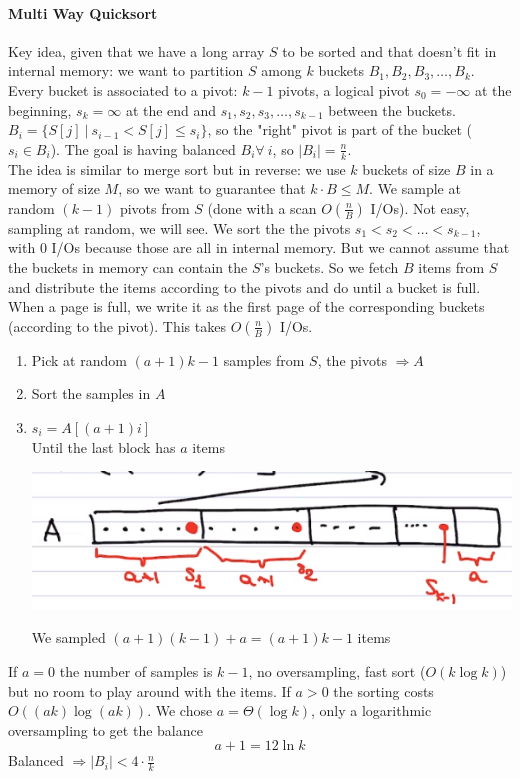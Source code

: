 \documentclass[10pt]{report}
\begin{document}
\paragraph{Multi Way Quicksort} Key idea, given that we have a long array $S$ to be sorted and that doesn't fit in internal memory: we want to partition $S$ among $k$ buckets $B_1,B_2,B_3,\ldots,B_k$. Every bucket is associated to a pivot: $k-1$ pivots, a logical pivot $s_0 = -\infty$ at the beginning, $s_k = \infty$ at the end and $s_1,s_2,s_3,\ldots,s_{k-1}$ between the buckets.\\
$B_i=\{S[j]\:|\: s_{i-1} < S[j] \leq s_i\}$, so the "right" pivot is part of the bucket ($s_i \in B_i$). The goal is having balanced $B_i \forall\:i$, so $|B_i| = \frac{n}{k}$.\\
The idea is similar to merge sort but in reverse: we use $k$ buckets of size $B$ in a memory of size $M$, so we want to guarantee that $k\cdot B \leq M$. We sample at random $(k-1)$ pivots from $S$ (done with a scan $O(\frac{n}{B})$ I/Os). Not easy, sampling at random, we will see. We sort the the pivots $s_1 < s_2 < \ldots < s_{k-1}$, with 0 I/Os because those are all in internal memory. But we cannot assume that the buckets in memory can contain the $S$'s buckets. So we fetch $B$ items from $S$ and distribute the items according to the pivots and do until a bucket is full. When a page is full, we write it as the first page of the corresponding buckets (according to the pivot). This takes $O(\frac{n}{B})$ I/Os.
\begin{enumerate}
	\item Pick at random $(a + 1)k - 1$ samples from $S$, the pivots $\Rightarrow A$
	\item Sort the samples in $A$
	\item $s_i = A[(a+1)i]$\\
	Until the last block has $a$ items
	\begin{center}
		\includegraphics[scale=0.5]{3.png}
	\end{center}
	We sampled $(a+1)(k-1) + a = (a+1)k -1$ items
\end{enumerate}
If $a = 0$ the number of samples is $k-1$, no oversampling, fast sort ($O(k\log k)$) but no room to play around with the items. If $a > 0$ the sorting costs $O((ak)\log (ak))$. We chose $a = \Theta(\log k)$, only a logarithmic oversampling to get the balance $$a + 1 = 12\ln k$$ Balanced $\Rightarrow |B_i| < 4\cdot\frac{n}{k}$
\end{document}
